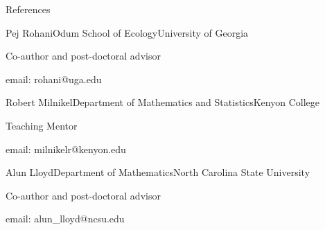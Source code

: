 \documentclass{resume} %
\begin{document}
\begin{rSection}{References}
\begin{rSubsection}{Pej Rohani}{}{Odum School of Ecology}{University of Georgia}
\item Co-author and post-doctoral advisor
\item email: rohani@uga.edu
\end{rSubsection}
\begin{rSubsection}{Robert Milnikel}{}{Department of Mathematics and Statistics}{Kenyon College}
\item Teaching Mentor
\item email: milnikelr@kenyon.edu
\end{rSubsection}
\begin{rSubsection}{Alun Lloyd}{}{Department of Mathematics}{North Carolina State University}
\item Co-author and post-doctoral advisor
\item email: alun\_lloyd@ncsu.edu
\end{rSubsection}
\end{rSection}
\end{document}
